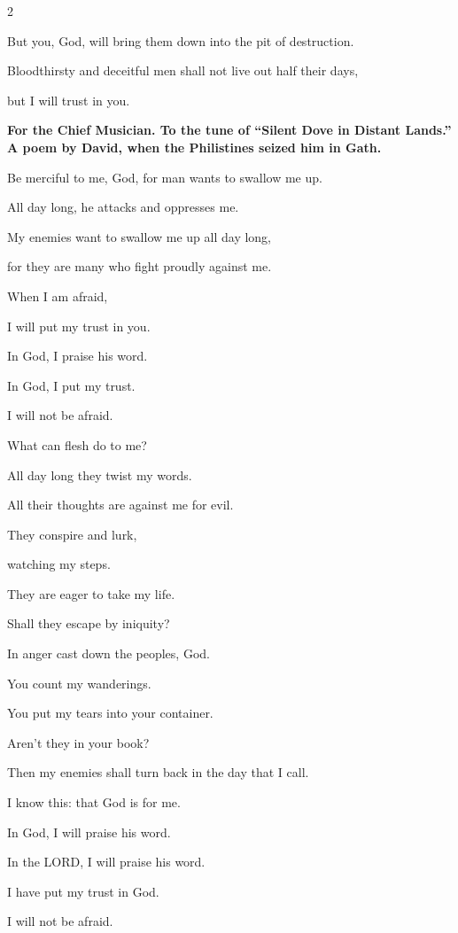 \begin{multicols}{2}
	
	\myverse{}But you, God, will bring them down into the pit of destruction.
	
	Bloodthirsty and deceitful men shall not live out half their days,
	
	but I will trust in you.
	
	
	\mychapter{}\textbf{For the Chief Musician. To the tune of “Silent Dove in Distant Lands.” A poem by David, when
		the Philistines seized him in Gath.}
	
	\myverse*{}Be merciful to me, God, for man wants to swallow me up.
	
	All day long, he attacks and oppresses me.
	
	
	\myverse{}My enemies want to swallow me up all day long,
	
	for they are many who fight proudly against me.
	
	
	\myverse{}When I am afraid,
	
	I will put my trust in you.
	
	
	\myverse{}In God, I praise his word.
	
	In God, I put my trust.
	
	I will not be afraid.
	
	What can flesh do to me?
	
	
	\myverse{}All day long they twist my words.
	
	All their thoughts are against me for evil.
	
	
	\myverse{}They conspire and lurk,
	
	watching my steps.
	
	They are eager to take my life.
	
	
	\myverse{}Shall they escape by iniquity?
	
	In anger cast down the peoples, God.
	
	
	\myverse{}You count my wanderings.
	
	You put my tears into your container.
	
	Aren’t they in your book?
	
	
	\myverse{}Then my enemies shall turn back in the day that I call.
	
	I know this: that God is for me.
	
	
	\myverse{}In God, I will praise his word.
	
	In the LORD, I will praise his word.
	
	
	\myverse{}I have put my trust in God.
	
	I will not be afraid.
	

\end{multicols}
